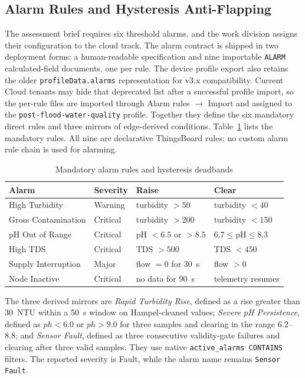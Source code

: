 \documentclass[conference]{IEEEtran}
\begin{document}
\subsection{Alarm Rules and Hysteresis Anti-Flapping}
\label{sec:alarms}

The assessment brief \cite{Brief} requires six threshold alarms, and the work division
\cite{Division} assigns their configuration to the cloud track. The alarm contract is
shipped in two deployment forms: a human-readable specification and nine importable
\texttt{ALARM} calculated-field documents, one per rule. The device profile export also
retains the older \texttt{profileData.alarms} representation for v3.x compatibility.
Current Cloud tenants may hide that deprecated list after a successful profile import,
so the per-rule files are imported through Alarm rules $\rightarrow$ Import and assigned
to the \texttt{post-flood-water-quality} profile. Together they define the six mandatory direct
rules and three mirrors of edge-derived conditions. Table~\ref{tab:rules} lists the
mandatory rules. All nine are declarative ThingsBoard rules; no custom alarm rule chain
is used for alarming.

\begin{table}[t]
\caption{Mandatory alarm rules and hysteresis deadbands}
\label{tab:rules}
\centering
\scriptsize
\begin{tabular}{@{}llll@{}}
\toprule
Alarm & Severity & Raise & Clear \\
\midrule
High Turbidity & Warning & turbidity $>50$ & turbidity $<40$ \\
Gross Contamination & Critical & turbidity $>200$ & turbidity $<150$ \\
pH Out of Range & Critical & pH $<6.5$ or $>8.5$ & $6.7\le$pH$\le8.3$ \\
High TDS & Critical & TDS $>500$ & TDS $<450$ \\
Supply Interruption & Major & flow $=0$ for 30~s & flow $>0$ \\
Node Inactive & Critical & no data for 90~s & telemetry resumes \\
\bottomrule
\end{tabular}
\end{table}

The three derived mirrors are \emph{Rapid Turbidity Rise}, defined as a rise greater than
30~NTU within a 50~s window on Hampel-cleaned values; \emph{Severe pH Persistence},
defined as $ph < 6.0$ or $ph > 9.0$ for three samples and clearing in the range
6.2--8.8; and \emph{Sensor Fault}, defined as three consecutive validity-gate failures
and clearing after three valid samples. They use native \texttt{active\_alarms CONTAINS}
filters. The reported severity is Fault, while the alarm name remains \texttt{Sensor
Fault}.
\end{document}

